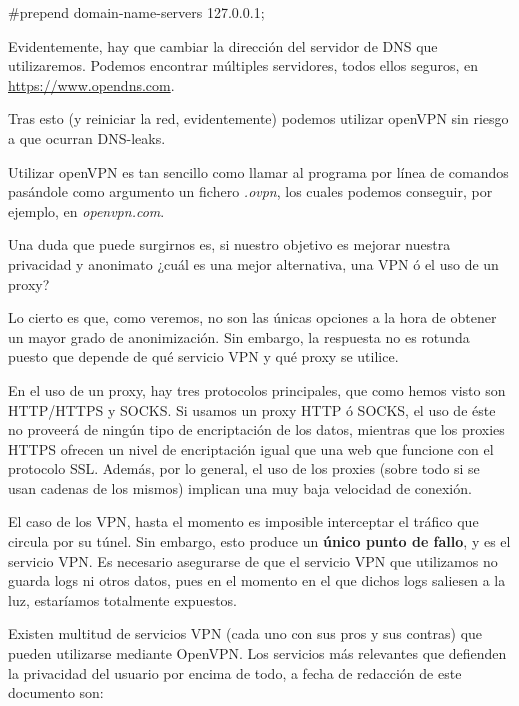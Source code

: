 	{\selectfont 
		\#prepend domain-name-servers 127.0.0.1;
	}

	Evidentemente, hay que cambiar la dirección del servidor de DNS que utilizaremos. Podemos encontrar múltiples servidores, todos ellos seguros, en \url{https://www.opendns.com}.
	
	Tras esto (y reiniciar la red, evidentemente) podemos utilizar openVPN sin riesgo a que ocurran DNS-leaks.
	
	Utilizar openVPN es tan sencillo como llamar al programa por línea de comandos pasándole como argumento un fichero \textit{.ovpn}, los cuales podemos conseguir, por ejemplo, en \textit{openvpn.com}.
	
	Una duda que puede surgirnos es, si nuestro objetivo es mejorar nuestra privacidad y anonimato ¿cuál es una mejor alternativa, una VPN ó el uso de un proxy? 
	
	Lo cierto es que, como veremos, no son las únicas opciones a la hora de obtener un mayor grado de anonimización. Sin embargo, la respuesta no es rotunda puesto que depende de qué servicio VPN y qué proxy se utilice.
	
	En el uso de un proxy, hay tres protocolos principales, que como hemos visto son HTTP/HTTPS y SOCKS.
	Si usamos un proxy HTTP ó SOCKS, el uso de éste no proveerá de ningún tipo de encriptación de los datos, mientras que los proxies HTTPS ofrecen un nivel de encriptación igual que una web que funcione con el protocolo SSL. Además, por lo general, el uso de los proxies (sobre todo si se usan cadenas de los mismos) implican una muy baja velocidad de conexión.
	
	El caso de los VPN, hasta el momento es imposible interceptar el tráfico que circula por su túnel. Sin embargo, esto produce un \textbf{único punto de fallo}, y es el servicio VPN. Es necesario asegurarse de que el servicio VPN que utilizamos no guarda logs ni otros datos, pues en el momento en el que dichos logs saliesen a la luz, estaríamos totalmente expuestos.
	
	Existen multitud de servicios VPN (cada uno con sus pros y sus contras) que pueden utilizarse mediante OpenVPN. Los servicios más relevantes que defienden la privacidad del usuario por encima de todo, a fecha de redacción de este documento son:
	

